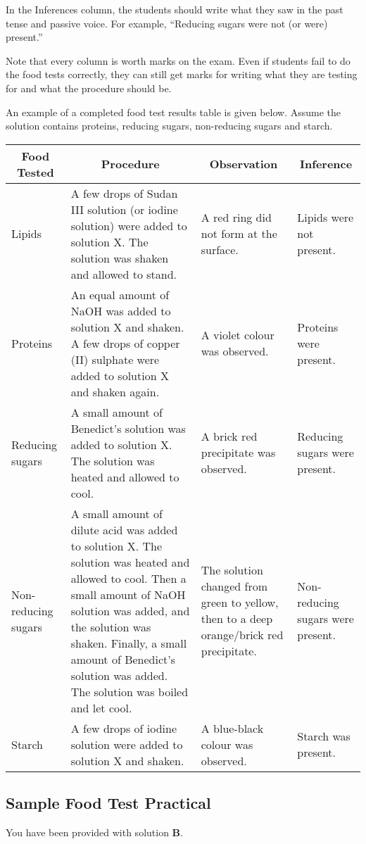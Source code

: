 In the Inferences column, the students should write what they saw in the past tense and passive voice. For example, ``Reducing sugars were not (or were) present.''

Note that every column is worth marks on the exam. Even if students fail to do the food tests correctly, they can still get marks for writing what they are testing for and what the procedure should be.

An example of a completed food test results table is given below. Assume the solution contains proteins, reducing sugars, non-reducing sugars and starch.

\begin{center}
\begin{tabular}{|p{3cm}|p{5cm}|p{3cm}|p{3cm}|} \hline
\multicolumn{1}{|c|}{\textbf{Food Tested}}&\multicolumn{1}{c|}{\textbf{Procedure}}&\multicolumn{1}{c|}{\textbf{Observation}}&\multicolumn{1}{c|}{\textbf{Inference}} \\ \hline
Lipids & A few drops of Sudan III solution (or iodine solution) were added to solution X. The solution was shaken and allowed to stand. & A red ring did not form at the surface. & Lipids were not present.\\ \hline
Proteins & An equal amount of NaOH was added to solution X and shaken. A few drops of copper (II) sulphate were added to solution X and shaken again. & A violet colour was observed. & Proteins were present.\\ \hline
Reducing sugars & A small amount of Benedict's solution  was added to solution X. The solution was heated and allowed to cool. & A brick red precipitate was observed. & Reducing sugars were present.\\ \hline
Non-reducing sugars & A small amount of dilute acid was added to solution X. The solution was heated and allowed to cool. Then a small amount of NaOH solution was added, and the solution was shaken. Finally, a small amount of Benedict’s solution was added. The solution was boiled and let cool. & The solution changed from green to yellow, then to a deep orange\slash brick red precipitate. & Non-reducing sugars were present.\\ \hline
Starch & A few drops of iodine solution were added to solution X and shaken. & A blue-black colour was observed. & Starch was present.\\ \hline
\end{tabular}
\end{center}

\subsection{Sample Food Test Practical}
You have been provided with solution \textbf{B}. 

